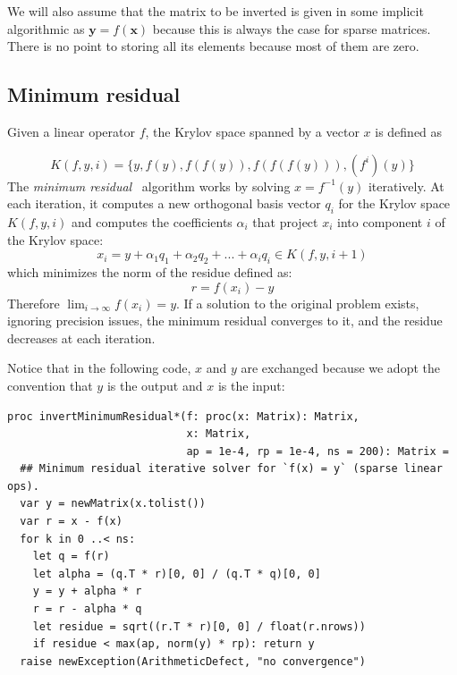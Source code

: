 \documentclass[justified, sixbynine]{tufte-book}
\def\ft{\small\tt}
\theoremstyle{plain}%
\newtheorem * {corollary}{Corollary}
\theoremstyle{definition}
\theoremstyle{remark}
\newtheorem * {remark}{Remark}
\newtheorem * {note}{Note}
\begin{document}
\begin{fullwidth}
We will also assume that the matrix to be inverted is given in some implicit algorithmic as $\mathbf{y}=f(\mathbf{x})$ because this is always the case for sparse matrices. There is no point to storing all its elements because most of them are zero.


\goodbreak\subsection{Minimum residual}


Given a linear operator $f$, the Krylov space spanned by a vector $x$ is defined as

\begin{equation}
K(f, y, i) = \{y, f(y), f(f(y)), f(f(f(y))), (f^i)(y)\}
\end{equation}
The {\it minimum residual}~\cite{minres} algorithm works by solving $x=f^{-1}(y)$ iteratively. At each iteration, it computes a new orthogonal basis vector $q_i$ for the Krylov space $K(f, y, i)$ and computes the coefficients $\alpha_i$ that project $x_i$ into component $i$ of the Krylov space:
\begin{equation}
x_i = y + \alpha_1 q_1 + \alpha_2 q_2 + ... + \alpha_i q_i \in K(f, y, i+1)
\end{equation}
which minimizes the norm of the residue defined as:
\begin{equation}
r = f(x_i) - y
\end{equation}
Therefore $\lim_{i\rightarrow\infty} f(x_i) = y$.
If a solution to the original problem exists, ignoring precision issues, the minimum residual converges to it, and the residue decreases at each iteration.

Notice that in the following code, $x$ and $y$ are exchanged because we adopt the convention that $y$ is the output and $x$ is the input:

\begin{lstlisting}[caption={in file: {\ft nlib/linalg.nim}}]
proc invertMinimumResidual*(f: proc(x: Matrix): Matrix,
                            x: Matrix,
                            ap = 1e-4, rp = 1e-4, ns = 200): Matrix =
  ## Minimum residual iterative solver for `f(x) = y` (sparse linear ops).
  var y = newMatrix(x.tolist())
  var r = x - f(x)
  for k in 0 ..< ns:
    let q = f(r)
    let alpha = (q.T * r)[0, 0] / (q.T * q)[0, 0]
    y = y + alpha * r
    r = r - alpha * q
    let residue = sqrt((r.T * r)[0, 0] / float(r.nrows))
    if residue < max(ap, norm(y) * rp): return y
  raise newException(ArithmeticDefect, "no convergence")
\end{lstlisting}


\end{fullwidth}
\end{document}
